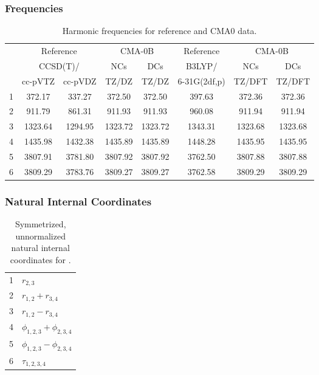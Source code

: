 \documentclass[10pt,oneside]{article}
\begin{document}
\clearpage

\subsubsection*{Frequencies}
\begin{table}[h!]
\centering
\caption{Harmonic frequencies for reference and CMA0 data.}
\begin{tabular}{cccccccc}
\toprule
{} & \multicolumn{2}{c}{Reference} & \multicolumn{2}{c}{CMA-0B} &    Reference & \multicolumn{2}{c}{CMA-0B} \\
{} & \multicolumn{2}{c}{CCSD(T)/} &     NCs &     DCs &       B3LYP/ &     NCs &     DCs \\
{} &   cc-pVTZ & cc-pVDZ &   TZ/DZ &   TZ/DZ & 6-31G(2df,p) &  TZ/DFT &  TZ/DFT \\
\midrule
1 &    372.17 &  337.27 &  372.50 &  372.50 &       397.63 &  372.36 &  372.36 \\
2 &    911.79 &  861.31 &  911.93 &  911.93 &       960.08 &  911.94 &  911.94 \\
3 &   1323.64 & 1294.95 & 1323.72 & 1323.72 &      1343.31 & 1323.68 & 1323.68 \\
4 &   1435.98 & 1432.38 & 1435.89 & 1435.89 &      1448.28 & 1435.95 & 1435.95 \\
5 &   3807.91 & 3781.80 & 3807.92 & 3807.92 &      3762.50 & 3807.88 & 3807.88 \\
6 &   3809.29 & 3783.76 & 3809.27 & 3809.27 &      3762.58 & 3809.29 & 3809.29 \\
\bottomrule
\end{tabular}
\end{table}

\clearpage

\subsubsection*{Natural Internal Coordinates}
\begin{table}[h!]
\centering
\caption{Symmetrized, unnormalized natural internal coordinates for .}
\small
\begin{tabular}{ll}
  1   & $r_{2,3}$ \\
  2   & $r_{1,2} + r_{3,4}$ \\
  3   & $r_{1,2} - r_{3,4}$ \\
  4   & $\phi_{1,2,3} + \phi_{2,3,4}$ \\
  5   & $\phi_{1,2,3} - \phi_{2,3,4}$ \\
  6   & $\tau_{1,2,3,4}$ \\
\end{tabular}
\end{table}
\end{document}
